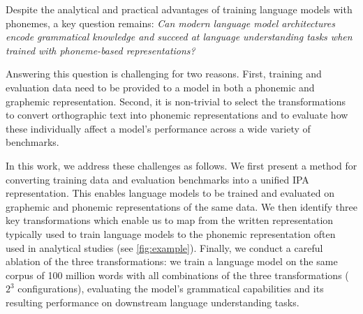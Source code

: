 \vspace{.3cm}

Despite the analytical and practical advantages of training language models with phonemes, a key question remains: \emph{Can modern language model architectures encode grammatical knowledge and succeed at language understanding tasks when trained with phoneme-based representations?} 

Answering this question is challenging for two reasons. First, training and evaluation data need to be provided to a model in both a phonemic and graphemic representation. Second, it is non-trivial to select the transformations to convert orthographic text into phonemic representations and to evaluate how these individually affect a model's performance across a wide variety of benchmarks.



In this work, we address these challenges as follows. We first present a method for converting training data and evaluation benchmarks into a unified IPA representation. This enables language models to be trained and evaluated on graphemic and phonemic representations of the same data. We then identify three key transformations which enable us to map from the written representation typically used to train language models to the phonemic representation often used in analytical studies (see \cref{fig:example}). Finally, we conduct a careful ablation of the three transformations: we train a language model on the same corpus of 100 million words with all combinations of the three transformations ($2^3$ configurations), evaluating the model's grammatical capabilities and its resulting performance on downstream language understanding tasks. 


